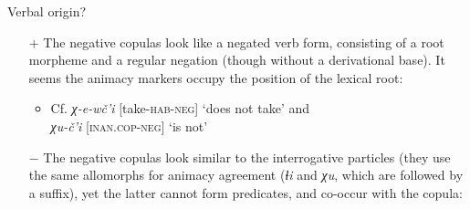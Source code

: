 \begin{frame}{Verbal origin?}
\begin{itemize}
   \item[{$+$}] The negative copulas look like a negated verb form, consisting of a root morpheme and a regular negation (though without a derivational base). It seems the animacy markers occupy the position of the lexical root:
   \begin{itemize}
       \item Cf. \textit{χ-e-wč'i} [take-\textsc{hab-neg}] `does not take' and\\ \textit{χu-č'i} [\textsc{inan.cop-neg}] `is not' %
   \end{itemize}
   \pause
    \item[{$-$}] The negative copulas look similar to the interrogative particles (they use the same allomorphs for animacy agreement (\textit{ɬi} and \textit{χu}, which are followed by a suffix), yet the latter cannot form predicates, and co-occur with the copula:

\end{itemize}
\end{frame}


